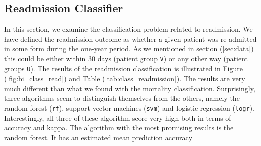 \documentclass[../thesis.tex]{subfiles}
\begin{document}
\subsection{Readmission Classifier}

\noindent In this section, we examine the classification problem related to readmission. We have defined the readmission outcome as whether a given patient was re-admitted in some form during the one-year period. As we mentioned in section (\ref{sec:data}) this could be either within 30 days (patient group \texttt{V}) or any other way (patient groups \texttt{U}). The results of the readmission classification is illustrated in Figure (\ref{fig:bi_class_read}) and Table (\ref{tab:class_readmission}). The results are very much different than what we found with the mortality classification. Surprisingly, three algorithms seem to distinguish themselves from the others, namely the random forest (\texttt{rf}), support vector machines (\texttt{svm}) and logistic regression (\texttt{logr}). Interestingly, all three of these algorithm score very high both in terms of accuracy and kappa. The algorithm with the most promising results is the random forest. It has an estimated mean prediction accuracy

\vspace*{-0,1cm}
\end{document}

